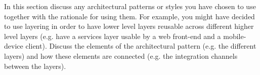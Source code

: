 In this section discuss any architectural patterns or styles you have chosen to use together with the
rationale for using them.
For example, you might have decided to use layering in order to have lower level layers reusable
across different higher level layers (e.g. have a services layer usable by a web front-end and a
mobile-device client).
Discuss the elements of the architectural pattern (e.g. the different layers) and how these elements
are connected (e.g. the integration channels between the layers).